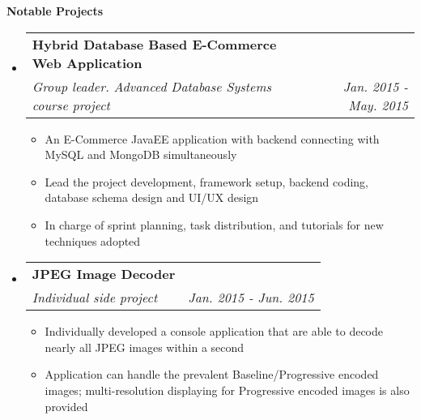 \documentclass[letterpaper,10pt]{article}
\makeatletter
\newcommand{\resitem}[1]{\item #1 \vspace{-2pt}}
\newcommand{\resheading}[1]{{\large \colorbox{mygrey}{\begin{minipage}{\textwidth}{\textbf{#1 \vphantom{p\^{E}}}}\end{minipage}}}}
\newcommand{\ressubheading}[4]{
\begin{tabular*}{7.0in}{l@{\extracolsep{\fill}}r}
		\textbf{#1} & #2 \\
		\textit{#3} & \textit{#4} \\
\end{tabular*}\vspace{-6pt}}
\makeatother
\begin{document}
\resheading{Notable Projects}
\begin{itemize}
\itemsep0em
\item
	\ressubheading{Hybrid Database Based E-Commerce Web Application}{}{Group leader. Advanced Database Systems course project}{Jan. 2015 - May. 2015}
	\begin{itemize}
        \resitem{An E-Commerce JavaEE application with backend connecting with MySQL and MongoDB simultaneously}
        \resitem{Lead the project development, framework setup, backend coding, database schema design and UI/UX design}
        \resitem{In charge of sprint planning, task distribution, and tutorials for new techniques adopted}
	\end{itemize}
\item
	\ressubheading{JPEG Image Decoder}{}{Individual side project}{Jan. 2015 - Jun. 2015}
	\begin{itemize}
		\resitem{Individually developed a console application that are able to decode nearly all JPEG images within a second}
        \resitem{Application can handle the prevalent Baseline/Progressive encoded images; multi-resolution displaying for Progressive encoded images is also provided}
	\end{itemize}
	
\end{itemize}
\end{document}
